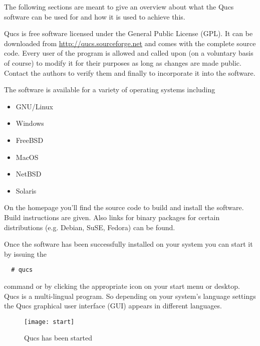 %
%
%
%


The following sections are meant to give an overview about what the
Qucs software can be used for and how it is used to achieve this.

\medskip

Qucs is free software licensed under the General Public License (GPL).
It can be downloaded from \url{http://qucs.sourceforge.net} and comes
with the complete source code.  Every user of the program is allowed
and called upon (on a voluntary basis of course) to modify it for
their purposes as long as changes are made public.  Contact the
authors to verify them and finally to incorporate it into the
software.

\medskip

The software is available for a variety of operating systems including
\begin{itemize}
\item GNU/Linux
\item Windows
\item FreeBSD
\item MacOS
\item NetBSD
\item Solaris
\end{itemize}

On the homepage you'll find the source code to build and install the
software.  Build instructions are given.  Also links for binary
packages for certain distributions (e.g. Debian, SuSE, Fedora) can be
found.

\medskip

Once the software has been successfully installed on your system you
can start it by issuing the
\begin{verbatim}
  # qucs
\end{verbatim}

command or by clicking the appropriate icon on your start menu or
desktop.  Qucs is a multi-lingual program.  So depending on your
system's language settings the Qucs graphical user interface (GUI)
appears in different languages.

\begin{figure}[ht]
  \centering
  \texttt{[image: start]}
  \caption{Qucs has been started}
  \label{fig:start}
\end{figure}
\FloatBarrier

